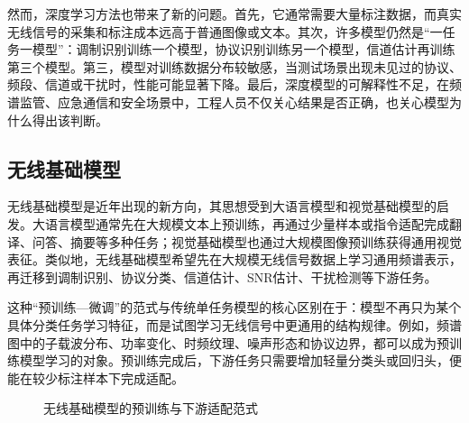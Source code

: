 \documentclass[UTF8,fontset=windows,zihao=-4]{ctexart}
\begin{document}
然而，深度学习方法也带来了新的问题。首先，它通常需要大量标注数据，而真实无线信号的采集和标注成本远高于普通图像或文本。其次，许多模型仍然是“一任务一模型”：调制识别训练一个模型，协议识别训练另一个模型，信道估计再训练第三个模型。第三，模型对训练数据分布较敏感，当测试场景出现未见过的协议、频段、信道或干扰时，性能可能显著下降。最后，深度模型的可解释性不足，在频谱监管、应急通信和安全场景中，工程人员不仅关心结果是否正确，也关心模型为什么得出该判断。

\subsection{无线基础模型}
无线基础模型是近年出现的新方向，其思想受到大语言模型和视觉基础模型的启发\cite{rf-gpt,wirelessgpt}。大语言模型通常先在大规模文本上预训练，再通过少量样本或指令适配完成翻译、问答、摘要等多种任务；视觉基础模型也通过大规模图像预训练获得通用视觉表征。类似地，无线基础模型希望先在大规模无线信号数据上学习通用频谱表示，再迁移到调制识别、协议分类、信道估计、SNR估计、干扰检测等下游任务。

这种“预训练—微调”的范式与传统单任务模型的核心区别在于：模型不再只为某个具体分类任务学习特征，而是试图学习无线信号中更通用的结构规律。例如，频谱图中的子载波分布、功率变化、时频纹理、噪声形态和协议边界，都可以成为预训练模型学习的对象\cite{lwm}。预训练完成后，下游任务只需要增加轻量分类头或回归头，便能在较少标注样本下完成适配。

\begin{figure}[H]
\centering
{}
\caption{无线基础模型的预训练与下游适配范式}
\label{fig:foundation-paradigm}
\end{figure}
\end{document}
